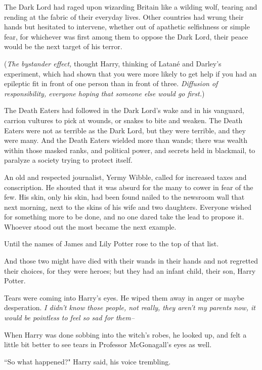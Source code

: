 The Dark Lord had raged upon wizarding Britain like a wilding wolf, tearing and rending at the fabric of their everyday lives. Other countries had wrung their hands but hesitated to intervene, whether out of apathetic selfishness or simple fear, for whichever was first among them to oppose the Dark Lord, their peace would be the next target of his terror.

(\emph{The bystander effect,} thought Harry, thinking of Latané and Darley's experiment, which had shown that you were more likely to get help if you had an epileptic fit in front of one person than in front of three. \emph{Diffusion of responsibility, everyone hoping that someone else would go first.})

The Death Eaters had followed in the Dark Lord's wake and in his vanguard, carrion vultures to pick at wounds, or snakes to bite and weaken. The Death Eaters were not as terrible as the Dark Lord, but they were terrible, and they were many. And the Death Eaters wielded more than wands; there was wealth within those masked ranks, and political power, and secrets held in blackmail, to paralyze a society trying to protect itself.

An old and respected journalist, Yermy Wibble, called for increased taxes and conscription. He shouted that it was absurd for the many to cower in fear of the few. His skin, only his skin, had been found nailed to the newsroom wall that next morning, next to the skins of his wife and two daughters. Everyone wished for something more to be done, and no one dared take the lead to propose it. Whoever stood out the most became the next example.

Until the names of James and Lily Potter rose to the top of that list.

And those two might have died with their wands in their hands and not regretted their choices, for they were heroes; but they had an infant child, their son, Harry Potter.

Tears were coming into Harry's eyes. He wiped them away in anger or maybe desperation. \emph{I didn't know those people, not really, they aren't my parents \emph{now}, it would be pointless to feel so sad for them\---}

When Harry was done sobbing into the witch's robes, he looked up, and felt a little bit better to see tears in Professor McGonagall's eyes as well.

``So what happened?" Harry said, his voice trembling.

